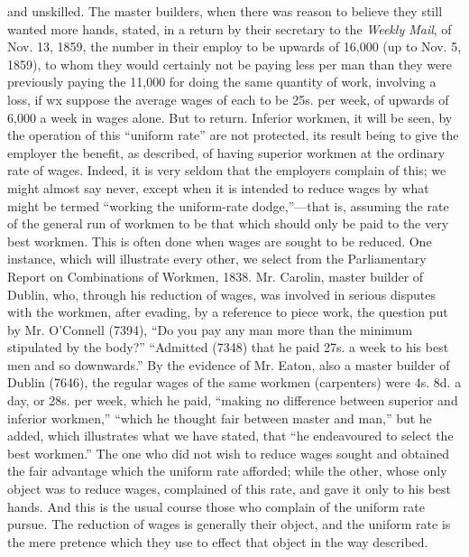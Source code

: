 and unskilled. The master builders, when there was reason to believe
they still wanted more hands, stated, in a return by their secretary to
the \textit{Weekly Mail}, of Nov. 13, 1859, the number in their employ
to be upwards of 16,000 (up to Nov. 5, 1859), to whom they would
certainly not be paying less per man than they were previously paying
the 11,000 for doing the same quantity of work, involving a loss, if wx
suppose the average wages of each to be 25s. per week, of upwards of
6,000 a week in wages alone. But to return. Inferior workmen, it will be
seen, by the operation of this ``uniform rate'' are not protected, its
result being to give the employer the benefit, as described, of having
superior workmen at the ordinary rate of wages. Indeed, it is very
seldom that the employers complain of this; we might almost say never,
except when it is intended to reduce wages by what might be termed
``working the uniform-rate dodge,''---that is, assuming the rate of the
general run of workmen to be that which should only be paid to the very
best workmen. This is often done when wages are sought to be reduced.
One instance, which will illustrate every other, we select from the
Parliamentary Report on Combinations of Workmen, 1838. Mr. Carolin,
master builder of Dublin, who, through his reduction of wages, was
involved in serious disputes with the workmen, after evading, by a
reference to piece work, the question put by Mr. O'Connell (7394), ``Do
you pay any man more than the minimum stipulated by the body?''
``Admitted (7348) that he paid 27s. a week to his best men and so
downwards.'' By the evidence of Mr. Eaton, also a master builder of
Dublin (7646), the regular wages of the same workmen (carpenters) were
4s. 8d. a day, or 28s. per week, which he paid, ``making no difference
between superior and inferior workmen,'' ``which he thought fair between
master and man,'' but he added, which illustrates what we have stated,
that ``he endeavoured to select the best workmen.'' The one who did not
wish to reduce wages sought and obtained the fair advantage which the
uniform rate afforded; while the other, whose only object was to reduce
wages, complained of this rate, and gave it only to his best hands. And
this is the usual course those who complain of the uniform rate pursue.
The reduction of wages is generally their object, and the uniform rate
is the mere pretence which they use to effect that object in the way
described.

